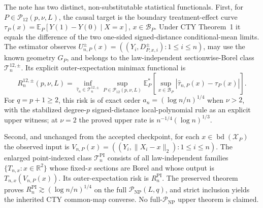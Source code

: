 The note has two distinct, non-substitutable statistical functionals.  First, for \(P\in\mathcal P_{12}(p,\nu,L)\), the causal target is the boundary treatment-effect curve \(\tau_P(x)=\mathbb E_P[Y(1)-Y(0)\mid X=x]\), \(x\in\mathcal B_P\).  Under CTY Theorem~1 it equals the difference of the two one-sided signed-distance conditional-mean limits.  The estimator observes \(U^{\pm}_{n,P}(x)=((Y_i,D^{\pm}_{P,x,i}):1\leq i\leq n)\), may use the known geometry \(G_P\), and belongs to the law-independent sectionwise-Borel class \(\mathcal T_n^{12,\pm}\).  Its explicit outer-expectation minimax functional is
\[
 R_n^{12,\pm}(p,\nu,L)=\inf_{\widehat\tau_n\in\mathcal T_n^{12,\pm}}
 \sup_{P\in\mathcal P_{12}(p,\nu,L)}
 \mathbb E_P^*\!\left[\sup_{x\in\mathcal B_P}|\widehat\tau_{n,P}(x)-\tau_P(x)|\right].
\]
For \(q=p+1\geq2\), this risk is of exact order \(a_n=(\log n/n)^{1/4}\) when \(\nu>2\), with the stabilized degree-\(p\) signed-distance local-polynomial rule as an explicit upper witness; at \(\nu=2\) the proved upper rate is \(n^{-1/4}(\log n)^{1/3}\).

Second, and unchanged from the accepted checkpoint, for each \(x\in\operatorname{bd}(\mathcal X_P)\) the observed input is \(V_{n,P}(x)=((Y_i,\lVert X_i-x\rVert_2):1\leq i\leq n)\).  The enlarged point-indexed class \(\mathcal T_n^{\mathrm{PI}}\) consists of all law-independent families \(\{T_{n,x}:x\in\mathbb R^2\}\) whose fixed-\(x\) sections are Borel and whose output is \(T_{n,x}(V_{n,P}(x))\).  Its outer-expectation risk is \(R_n^{\mathrm{PI}}\).  The preserved theorem proves \(R_n^{\mathrm{PI}}\gtrsim(\log n/n)^{1/4}\) on the full \(\mathcal P_{\mathrm{NP}}(L,q)\), and strict inclusion yields the inherited CTY common-map converse.  No full-\(\mathcal P_{\mathrm{NP}}\) upper theorem is claimed.